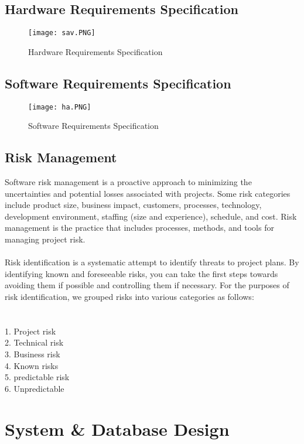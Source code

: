 \documentclass{article}
\begin{document}
\subsection{Hardware Requirements Specification}
\begin{figure}[htp]
    \centering
    \texttt{[image: sav.PNG]}
    \caption{Hardware Requirements Specification }
\end{figure}
\subsection{Software Requirements Specification}
\begin{figure}[htp]
    \centering
    \texttt{[image: ha.PNG]}
    \caption{Software Requirements Specification  }
    \label{fig:Software Requirements Specification   }
\end{figure}
\newpage
\subsection{Risk Management }
Software risk management is a proactive approach to minimizing the uncertainties and potential losses associated with projects. Some risk categories include product size, business impact, customers, processes, technology, development environment, staffing (size and experience), schedule, and cost. Risk management is the practice that includes processes, methods, and tools for managing project risk.\\\\
Risk identification is a systematic attempt to identify threats to project plans. By identifying known and foreseeable risks, you can take the first steps towards avoiding them if possible and controlling them if necessary. For the purposes of risk identification, we grouped risks into various categories as follows:\\\\
\\
1. Project risk\\
2. Technical risk\\
3. Business risk\\
4. Known risks\\
5. predictable risk\\
6. Unpredictable\\
\newpage
\section{System & Database Design }
\end{document}
